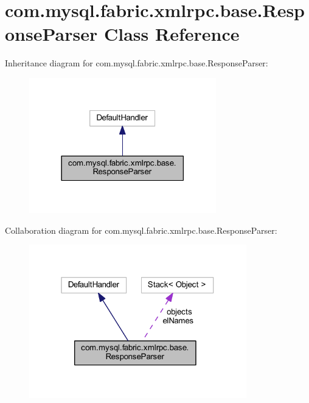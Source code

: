 \hypertarget{classcom_1_1mysql_1_1fabric_1_1xmlrpc_1_1base_1_1_response_parser}{}\section{com.\+mysql.\+fabric.\+xmlrpc.\+base.\+Response\+Parser Class Reference}
\label{classcom_1_1mysql_1_1fabric_1_1xmlrpc_1_1base_1_1_response_parser}


Inheritance diagram for com.\+mysql.\+fabric.\+xmlrpc.\+base.\+Response\+Parser\+:\nopagebreak
\begin{figure}[H]
\begin{center}
\leavevmode
\includegraphics[width=230pt]{classcom_1_1mysql_1_1fabric_1_1xmlrpc_1_1base_1_1_response_parser__inherit__graph}
\end{center}
\end{figure}


Collaboration diagram for com.\+mysql.\+fabric.\+xmlrpc.\+base.\+Response\+Parser\+:\nopagebreak
\begin{figure}[H]
\begin{center}
\leavevmode
\includegraphics[width=268pt]{classcom_1_1mysql_1_1fabric_1_1xmlrpc_1_1base_1_1_response_parser__coll__graph}
\end{center}
\end{figure}
